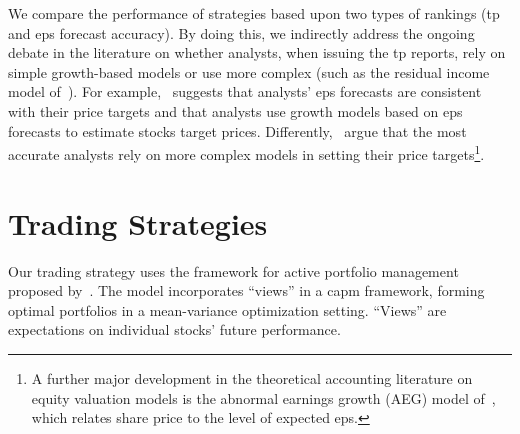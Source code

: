 \documentclass[a4paper,twoside,12pt,openright,notitlepage]{report}\usepackage[]{graphicx}\usepackage[]{color}
\begin{document}
We compare the performance of  strategies based upon two types of rankings (\acrlong{tp} and \gls{eps} forecast accuracy). By doing this, we indirectly address the ongoing debate in the literature on whether analysts, when issuing the \acrlong{tp} reports, rely on simple growth-based models or use more complex  (such as the residual income model of~\cite{ohlson1995}). For example,~\cite{bradshaw2004} suggests that analysts' \acrshort{eps} forecasts are consistent with their price targets and that analysts use growth models based on \gls{eps} forecasts to estimate stocks target prices. Differently,~\cite{simon2011} argue that the most accurate analysts rely on more complex models in setting their price targets\footnote{A further major development in the theoretical accounting literature on equity valuation models is the abnormal earnings growth (AEG) model of~\cite{ohlson2005}, which relates share price to the level of expected \acrlong{eps}.}.








\section{Trading Strategies}
\label{ch1-sec:trading}
Our trading strategy uses the framework for  active portfolio management proposed by~\cite{black1992}.  The model incorporates ``views'' in a \gls{capm}  framework, forming optimal portfolios in a mean-variance optimization setting. ``Views'' are expectations on individual stocks' future performance.
\end{document}
